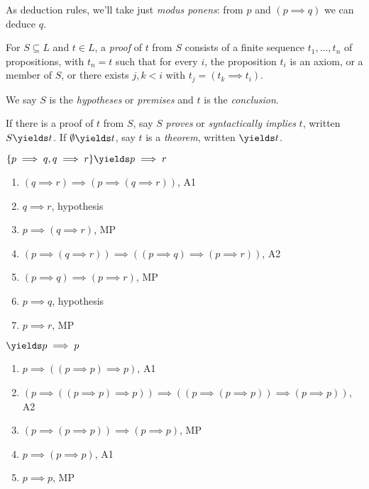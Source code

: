 \documentclass[a4paper]{article}
\begin{document}
As deduction rules, we'll take just \emph{modus ponens}: from \(p\) and \((p \implies q)\) we can deduce \(q\).

\begin{definition}[Proof]
  For \(S \subseteq L\) and \(t \in L\), a \emph{proof} of \(t\) from \(S\) consists of a finite sequence \(t_1, \dots, t_n\) of propositions, with \(t_n = t\) such that for every \(i\), the proposition \(t_i\) is an axiom, or a member of \(S\), or there exists \(j, k < i\) with \(t_j = (t_k \implies t_i)\).

  We say \(S\) is the \emph{hypotheses} or \emph{premises} and \(t\) is the \emph{conclusion}.
\end{definition}

\begin{definition}
  If there is a proof of \(t\) from \(S\), say \(S\) \emph{proves} or \emph{syntactically implies} \(t\), written \(S \yields t\). If \(\emptyset \yields t\), say \(t\) is a \emph{theorem}, written \(\yields t\).
\end{definition}

\begin{eg}
  \(\{p \implies q, q \implies r\} \yields p \implies r\)
  \begin{enumerate}
  \item \((q \implies r) \implies (p \implies (q \implies r))\), A1
  \item \(q \implies r\), hypothesis
  \item \(p \implies (q \implies r)\), MP
  \item \((p \implies (q \implies r)) \implies ((p \implies q) \implies (p \implies r))\), A2
  \item \((p \implies q) \implies (p \implies r)\), MP
  \item \(p \implies q\), hypothesis
  \item \(p \implies r\), MP
  \end{enumerate}
\end{eg}

\begin{eg}
  \(\yields p \implies p\)
  \begin{enumerate}
  \item \(p \implies ((p \implies p) \implies p)\), A1
  \item \((p \implies ((p \implies p) \implies p)) \implies ((p \implies (p \implies p)) \implies (p \implies p))\), A2
  \item \((p \implies (p \implies p)) \implies (p \implies p)\), MP
  \item \(p \implies (p \implies p)\), A1
  \item \(p \implies p\), MP
  \end{enumerate}
\end{eg}
\end{document}
